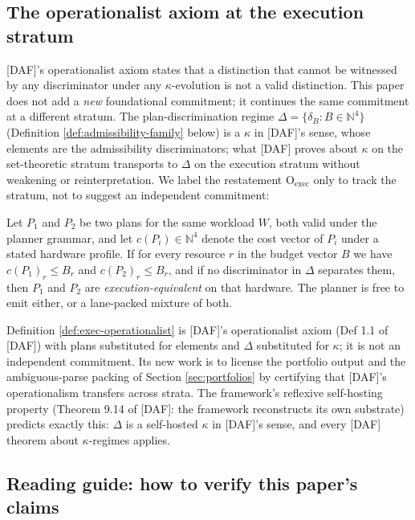 \subsection{The operationalist axiom at the execution stratum}

[DAF]'s operationalist axiom states that a distinction that cannot
be witnessed by any discriminator under any $\kappa$-evolution is
not a valid distinction. This paper does not add a \emph{new}
foundational commitment; it continues the same commitment at a
different stratum. The plan-discrimination regime
$\Delta = \{\delta_B : B \in \mathbb{N}^4\}$
(Definition \ref{def:admissibility-family} below) is a $\kappa$ in
[DAF]'s sense, whose elements are the admissibility discriminators;
what [DAF] proves about $\kappa$ on the set-theoretic stratum
transports to $\Delta$ on the execution stratum without weakening
or reinterpretation. We label the restatement
\textsf{O}$_{\mathrm{exec}}$ only to track the stratum, not to
suggest an independent commitment:

\begin{definition}
  \label{def:exec-operationalist}
  Let $P_1$ and $P_2$ be two plans for the same workload $W$, both
  valid under the planner grammar, and let $c(P_i) \in
  \mathbb{N}^4$ denote the cost vector of $P_i$
  under a stated hardware profile. If for every resource $r$ in the
  budget vector $B$ we have $c(P_1)_r \leq B_r$ and $c(P_2)_r \leq
  B_r$, and if no discriminator in $\Delta$ separates them, then
  $P_1$ and $P_2$ are \emph{execution-equivalent} on that hardware.
  The planner is free to emit either, or a lane-packed mixture of
  both.
\end{definition}

Definition \ref{def:exec-operationalist} is [DAF]'s operationalist
axiom (Def 1.1 of [DAF]) with plans substituted for elements and
$\Delta$ substituted for $\kappa$; it is not an independent
commitment. Its new work is to license the portfolio output and
the ambiguous-parse packing of Section \ref{sec:portfolios} by
certifying that [DAF]'s operationalism transfers across strata.
The framework's reflexive self-hosting property (Theorem 9.14 of
[DAF]: the framework reconstructs its own substrate) predicts
exactly this: $\Delta$ is a self-hosted $\kappa$ in [DAF]'s
sense, and every [DAF] theorem about $\kappa$-regimes applies.

\subsection{Reading guide: how to verify this paper's claims}
\label{sec:reading-guide}


